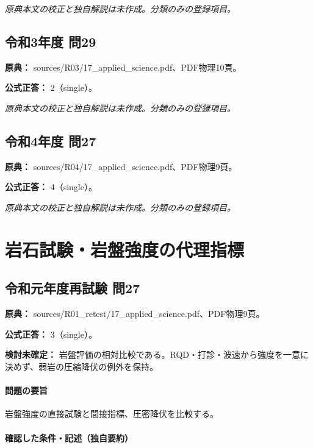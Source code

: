\par\textit{原典本文の校正と独自解説は未作成。分類のみの登録項目。}

\subsection{令和3年度 問29}
\label{q:r03-reg-applied-29}

\noindent\textbf{原典：} sources/R03/17\_applied\_science.pdf、PDF物理10頁。

\textbf{公式正答：} 2（single）。

\par\textit{原典本文の校正と独自解説は未作成。分類のみの登録項目。}

\subsection{令和4年度 問27}
\label{q:r04-reg-applied-27}

\noindent\textbf{原典：} sources/R04/17\_applied\_science.pdf、PDF物理9頁。

\textbf{公式正答：} 4（single）。

\par\textit{原典本文の校正と独自解説は未作成。分類のみの登録項目。}

\section{岩石試験・岩盤強度の代理指標}

\subsection{令和元年度再試験 問27}
\label{q:r01-ret-applied-27}

\noindent\textbf{原典：} sources/R01\_retest/17\_applied\_science.pdf、PDF物理9頁。

\textbf{公式正答：} 3（single）。

\par\textbf{検討未確定：} 岩盤評価の相対比較である。RQD・打診・波速から強度を一意に決めず、弱岩の圧縮降伏の例外を保持。

\paragraph{問題の要旨} 岩盤強度の直接試験と間接指標、圧密降伏を比較する。

\paragraph{確認した条件・記述（独自要約）}\mbox{}\par


